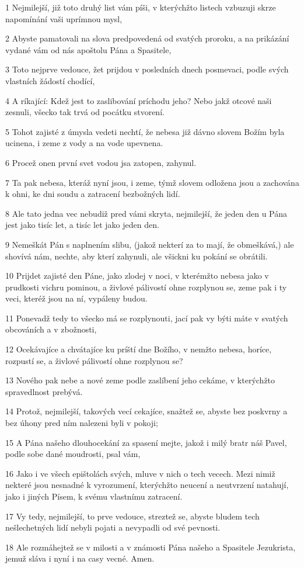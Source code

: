 \par 1 Nejmilejší, již toto druhý list vám píši, v kterýchžto listech vzbuzuji skrze napomínání vaši uprímnou mysl,
\par 2 Abyste pamatovali na slova predpovedená od svatých proroku, a na prikázání vydané vám od nás apoštolu Pána a Spasitele,
\par 3 Toto nejprve vedouce, žet prijdou v posledních dnech posmevaci, podle svých vlastních žádostí chodící,
\par 4 A ríkající: Kdež jest to zaslibování príchodu jeho? Nebo jakž otcové naši zesnuli, všecko tak trvá od pocátku stvorení.
\par 5 Tohot zajisté z úmysla vedeti nechtí, že nebesa již dávno slovem Božím byla ucinena, i zeme z vody a na vode upevnena.
\par 6 Procež onen první svet vodou jsa zatopen, zahynul.
\par 7 Ta pak nebesa, kteráž nyní jsou, i zeme, týmž slovem odložena jsou a zachována k ohni, ke dni soudu a zatracení bezbožných lidí.
\par 8 Ale tato jedna vec nebudiž pred vámi skryta, nejmilejší, že jeden den u Pána jest jako tisíc let, a tisíc let jako jeden den.
\par 9 Nemeškát Pán s naplnením slibu, (jakož nekterí za to mají, že obmeškává,) ale shovívá nám, nechte, aby kterí zahynuli, ale všickni ku pokání se obrátili.
\par 10 Prijdet zajisté den Páne, jako zlodej v noci, v kterémžto nebesa jako v prudkosti vichru pominou, a živlové pálivostí ohne rozplynou se, zeme pak i ty veci, kteréž jsou na ní, vypáleny budou.
\par 11 Ponevadž tedy to všecko má se rozplynouti, jací pak vy býti máte v svatých obcováních a v zbožnosti,
\par 12 Ocekávajíce a chvátajíce ku príští dne Božího, v nemžto nebesa, horíce, rozpustí se, a živlové pálivostí ohne rozplynou se?
\par 13 Nového pak nebe a nové zeme podle zaslíbení jeho cekáme, v kterýchžto spravedlnost prebývá.
\par 14 Protož, nejmilejší, takových vecí cekajíce, snažtež se, abyste bez poskvrny a bez úhony pred ním nalezeni byli v pokoji;
\par 15 A Pána našeho dlouhocekání za spasení mejte, jakož i milý bratr náš Pavel, podle sobe dané moudrosti, psal vám,
\par 16 Jako i ve všech epištolách svých, mluve v nich o tech vecech. Mezi nimiž nekteré jsou nesnadné k vyrozumení, kterýchžto neucení a neutvrzení natahují, jako i jiných Písem, k svému vlastnímu zatracení.
\par 17 Vy tedy, nejmilejší, to prve vedouce, streztež se, abyste bludem tech nešlechetných lidí nebyli pojati a nevypadli od své pevnosti.
\par 18 Ale rozmáhejtež se v milosti a v známosti Pána našeho a Spasitele Jezukrista, jemuž sláva i nyní i na casy vecné. Amen.


